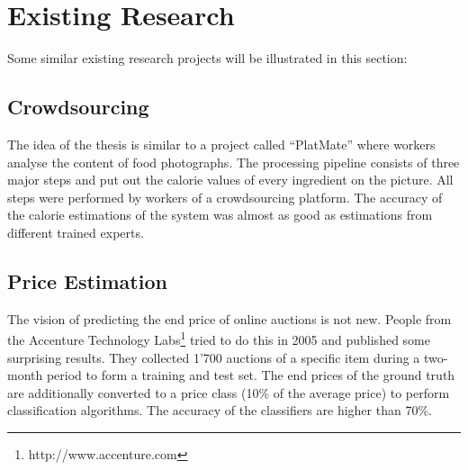 \documentclass[a4paper]{report}
\begin{document}
\section{Existing Research}
Some similar existing research projects will be illustrated in this section: 
\subsection{Crowdsourcing}
The idea of the thesis is similar to a project called ``PlatMate''\cite{platemate} where workers analyse the content of food photographs. The processing pipeline consists of three major steps and put out the calorie values of every ingredient on the picture. All steps were performed by workers of a crowdsourcing platform. The accuracy of the calorie estimations of the system was almost as good as estimations from different trained experts. 
\subsection{Price Estimation}
The vision of predicting the end price of online auctions is not new. People from the Accenture Technology Labs\footnote{http://www.accenture.com} tried to do this in 2005 and published some surprising results\cite{ghani}. They collected 1'700 auctions of a specific item during a two-month period to form a training and test set. The end prices of the ground truth are additionally converted to a price class (10\% of the average price) to perform classification algorithms. The accuracy of the classifiers are higher than 70\%.
\end{document}
